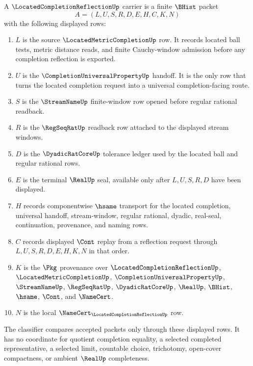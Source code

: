 \begin{definition}
\label{def:located-completion-reflection-carrier}
A $\LocatedCompletionReflectionUp$ carrier is a finite $\BHist$ packet
$$
A=(L,U,S,R,D,E,H,C,K,N)
$$
with the following displayed rows:
\begin{enumerate}
\item $L$ is the source $\LocatedMetricCompletionUp$ row. It records located ball tests, metric distance reads, and finite Cauchy-window admission before any completion reflection is exported.
\item $U$ is the $\CompletionUniversalPropertyUp$ handoff. It is the only row that turns the located completion request into a universal completion-facing route.
\item $S$ is the $\StreamNameUp$ finite-window row opened before regular rational readback.
\item $R$ is the $\RegSeqRatUp$ readback row attached to the displayed stream windows.
\item $D$ is the $\DyadicRatCoreUp$ tolerance ledger used by the located ball and regular rational rows.
\item $E$ is the terminal $\RealUp$ seal, available only after $L,U,S,R,D$ have been displayed.
\item $H$ records componentwise $\hsame$ transport for the located completion, universal handoff, stream-window, regular rational, dyadic, real-seal, continuation, provenance, and naming rows.
\item $C$ records displayed $\Cont$ replay from a reflection request through $L,U,S,R,D,E,H,K,N$ in that order.
\item $K$ is the $\Pkg$ provenance over $\LocatedCompletionReflectionUp$, $\LocatedMetricCompletionUp$, $\CompletionUniversalPropertyUp$, $\StreamNameUp$, $\RegSeqRatUp$, $\DyadicRatCoreUp$, $\RealUp$, $\BHist$, $\hsame$, $\Cont$, and $\NameCert$.
\item $N$ is the local $\NameCert_{\LocatedCompletionReflectionUp}$ row.
\end{enumerate}
The classifier compares accepted packets only through these displayed rows. It has no coordinate for quotient completion equality, a selected completed representative, a selected limit, countable choice, trichotomy, open-cover compactness, or ambient $\RealUp$ completeness.
\end{definition}

